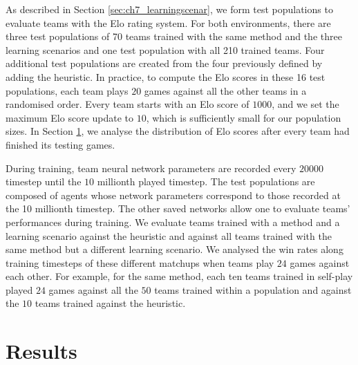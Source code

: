 As described in Section \ref{sec:ch7_learningscenar}, we form test populations to evaluate teams with the Elo rating system.
For both environments, there are three test populations of 70 teams trained with the same method and the three learning scenarios and one test population with all 210 trained teams.
Four additional test populations are created from the four previously defined by adding the heuristic.
In practice, to compute the Elo scores in these 16 test populations, each team plays $20$ games against all the other teams in a randomised order.
Every team starts with an Elo score of $1000$, and we set the maximum Elo score update to $10$, which is sufficiently small for our population sizes.
In Section \ref{sec:ch7_results}, we analyse the distribution of Elo scores after every team had finished its testing games.

During training, team neural network parameters are recorded every $20000$ timestep until the $10$ millionth played timestep.
The test populations are composed of agents whose network parameters correspond to those recorded at the 10 millionth timestep.
The other saved networks allow one to evaluate teams' performances during training.
We evaluate teams trained with a method and a learning scenario against the heuristic and against all teams trained with the same method but a different learning scenario.
We analysed the win rates along training timesteps of these different matchups when teams play $24$ games against each other.
For example, for the same method, each ten teams trained in self-play played $24$ games against all the $50$ teams trained within a population and against the $10$ teams trained against the heuristic.

\section{Results} \label{sec:ch7_results}

\begin{figure}[h]
 
\end{figure} 

